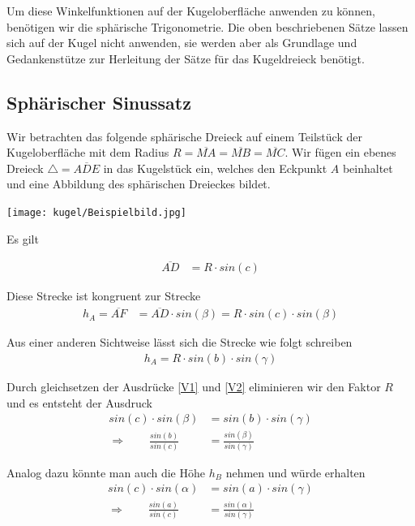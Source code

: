 \begin{refsection}
\begin{refsection}
Um diese Winkelfunktionen auf der Kugeloberfläche anwenden zu können, benötigen wir die sphärische Trigonometrie. Die oben beschriebenen Sätze lassen sich auf der Kugel nicht anwenden, sie werden aber als Grundlage und Gedankenstütze zur Herleitung der Sätze für das Kugeldreieck benötigt.



\subsection{Sphärischer Sinussatz}
Wir betrachten das folgende sphärische Dreieck auf einem Teilstück der Kugeloberfläche mit dem Radius $R= \overline{MA} = \overline{MB} = \overline{MC}$. Wir fügen ein ebenes Dreieck $\triangle=\overline{ADE}$ in das Kugelstück ein, welches den Eckpunkt $A$ beinhaltet und eine Abbildung des sphärischen Dreieckes bildet.

\begin{center}
        \texttt{[image: kugel/Beispielbild.jpg]}
\end{center}

Es gilt

\begin{align*}
\overline{AD} &= R \cdot sin (c)
\end{align*}

Diese Strecke ist kongruent zur Strecke
\begin{align}
h_{A} = \overline{AF} &= \overline{AD} \cdot sin(\beta) = R \cdot sin(c) \cdot sin(\beta)  
\label {V1}
\end{align}

Aus einer anderen Sichtweise lässt sich die Strecke wie folgt schreiben
\begin{align}
h_{A} = R \cdot sin(b) \cdot sin(\gamma)  
\label {V2}
\end{align}

Durch gleichsetzen der Ausdrücke \eqref{V1} und \eqref{V2} eliminieren wir den Faktor $R$ und es entsteht der Ausdruck
\begin{align*}
sin(c) \cdot sin(\beta) &= sin(b) \cdot sin(\gamma) \\
\Rightarrow \quad \quad
\frac{sin (b)}{sin (c)} &= \frac{sin (\beta)}{sin (\gamma)}
\end{align*}

Analog dazu könnte man auch die Höhe $h_{B}$ nehmen und würde erhalten
\begin{align*}
sin(c) \cdot sin(\alpha) &= sin(a) \cdot sin(\gamma) \\
\Rightarrow \quad \quad
\frac{sin (a)}{sin (c)} &= \frac{sin (\alpha)}{sin (\gamma)}
\end{align*}


\end{refsection}
\end{refsection}
